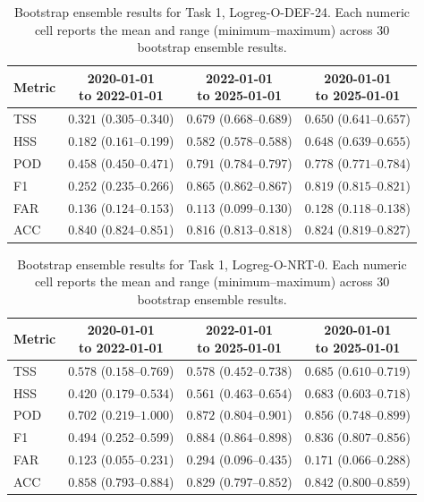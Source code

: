 \begin{table}[htbp]
\centering
\small
\caption{Bootstrap ensemble results for Task 1, Logreg-O-DEF-24. Each numeric cell reports the mean and range (minimum--maximum) across 30 bootstrap ensemble results.}
\label{tab:app-task1-logreg-o-def-24}
\begin{tabular}{lccc}
\toprule
Metric & \shortstack{2020-01-01\\to 2022-01-01} & \shortstack{2022-01-01\\to 2025-01-01} & \shortstack{2020-01-01\\to 2025-01-01} \\
\midrule
TSS & $0.321$ ($0.305$--$0.340$) & $0.679$ ($0.668$--$0.689$) & $0.650$ ($0.641$--$0.657$) \\
HSS & $0.182$ ($0.161$--$0.199$) & $0.582$ ($0.578$--$0.588$) & $0.648$ ($0.639$--$0.655$) \\
POD & $0.458$ ($0.450$--$0.471$) & $0.791$ ($0.784$--$0.797$) & $0.778$ ($0.771$--$0.784$) \\
F1 & $0.252$ ($0.235$--$0.266$) & $0.865$ ($0.862$--$0.867$) & $0.819$ ($0.815$--$0.821$) \\
FAR & $0.136$ ($0.124$--$0.153$) & $0.113$ ($0.099$--$0.130$) & $0.128$ ($0.118$--$0.138$) \\
ACC & $0.840$ ($0.824$--$0.851$) & $0.816$ ($0.813$--$0.818$) & $0.824$ ($0.819$--$0.827$) \\
\bottomrule
\end{tabular}
\end{table}
\clearpage

\begin{table}[htbp]
\centering
\small
\caption{Bootstrap ensemble results for Task 1, Logreg-O-NRT-0. Each numeric cell reports the mean and range (minimum--maximum) across 30 bootstrap ensemble results.}
\label{tab:app-task1-logreg-o-nrt-0}
\begin{tabular}{lccc}
\toprule
Metric & \shortstack{2020-01-01\\to 2022-01-01} & \shortstack{2022-01-01\\to 2025-01-01} & \shortstack{2020-01-01\\to 2025-01-01} \\
\midrule
TSS & $0.578$ ($0.158$--$0.769$) & $0.578$ ($0.452$--$0.738$) & $0.685$ ($0.610$--$0.719$) \\
HSS & $0.420$ ($0.179$--$0.534$) & $0.561$ ($0.463$--$0.654$) & $0.683$ ($0.603$--$0.718$) \\
POD & $0.702$ ($0.219$--$1.000$) & $0.872$ ($0.804$--$0.901$) & $0.856$ ($0.748$--$0.899$) \\
F1 & $0.494$ ($0.252$--$0.599$) & $0.884$ ($0.864$--$0.898$) & $0.836$ ($0.807$--$0.856$) \\
FAR & $0.123$ ($0.055$--$0.231$) & $0.294$ ($0.096$--$0.435$) & $0.171$ ($0.066$--$0.288$) \\
ACC & $0.858$ ($0.793$--$0.884$) & $0.829$ ($0.797$--$0.852$) & $0.842$ ($0.800$--$0.859$) \\
\bottomrule
\end{tabular}
\end{table}
\clearpage

